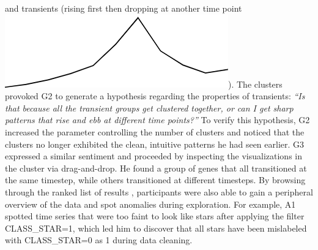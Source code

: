  and transients (rising first then dropping at another time point \includegraphics[width=2\baselineskip,keepaspectratio]{figures/transient.png}). The clusters provoked G2 to generate a hypothesis
 regarding the properties of transients:
 \textit{``Is that because all the transient groups
 get clustered together, or can I get sharp patterns
 that rise and ebb at different time points?''}
 To verify this hypothesis, G2 increased the parameter controlling the number of clusters and noticed that the clusters
 no longer exhibited the clean,
 intuitive patterns he had seen earlier.
 G3 expressed a similar sentiment and proceeded
 by inspecting the visualizations
 in the cluster via drag-and-drop.
 He found a group of genes that all transitioned
 at the same timestep, while others transitioned
 at different timesteps.
  By browsing through the ranked list of
 results , participants were also able to
 gain a peripheral overview of the data
 and spot anomalies during exploration.
 For example, A1 spotted time series
 that were too faint to look like stars
 after applying the filter CLASS\_STAR=1,
 which led him to discover that all stars
 have been mislabeled with CLASS\_STAR=0 as 1 during data cleaning.
